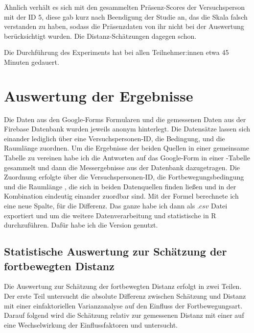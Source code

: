         Ähnlich verhält es sich mit den gesammelten Präsenz-Scores der Versuchsperson mit der ID 5, diese gab kurz nach Beendigung der Studie an, das die Skala falsch verstanden zu haben, sodass die Präsenzdaten von ihr nicht bei der Auswertung berücksichtigt wurden. Die Distanz-Schätzungen dagegen schon.

        Die Durchführung des Experiments hat bei allen Teilnehmer:innen etwa 45 Minuten gedauert.

        \section{Auswertung der Ergebnisse} %
            Die Daten aus den Google-Forms Formularen und die gemessenen Daten aus der Firebase Datenbank wurden jeweils anonym hinterlegt. Die Datensätze lassen sich einander lediglich über eine Versuchspersonen-ID, die Bedingung, und die Raumlänge %
            zuordnen.
            Um die Ergebnisse der beiden Quellen in einer gemeinsame Tabelle zu vereinen habe ich die Antworten auf das Google-Form in einer -Tabelle gesammelt und dann die Messergebnisse aus der Datenbank dazugetragen. Die Zuordnung erfolgte über die Versuchspersonen-ID, die Fortbewegungsbedingung und die Raumlänge%
            , die sich in beiden Datenquellen finden ließen und in der Kombination eindeutig einander zuordbar sind.
            Mit der Formel %
            berechnete ich eine neue Spalte, für die Differenz. Das ganze habe ich dann als $.csv$ Datei exportiert und um die weitere Datenverarbeitung und statistische in R durchzuführen. Dafür habe ich die Version  genutzt.

                \subsection{Statistische Auswertung zur Schätzung der fortbewegten Distanz}
                    Die Auswertung zur Schätzung der fortbewegten Distanz erfolgt in zwei Teilen.
                    Der erste Teil untersucht die absolute Differenz zwischen Schätzung und Distanz mit einer einfaktoriellen Varianzanalyse auf den Einfluss der Fortbewegungsart.
                    Darauf folgend wird die Schätzung relativ zur gemessenen Distanz mit einer auf eine Wechselwirkung der Einflussfaktoren  und  untersucht.

